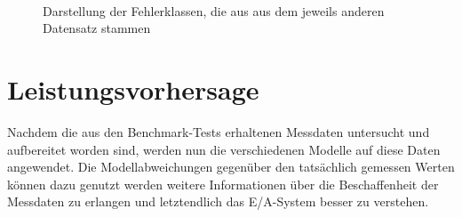 \documentclass[
	12pt,
	a4paper,
	BCOR10mm,
	DIV14,
	listof=totoc,
	bibliography=totoc,
	headsepline
]{scrreprt}
\begin{document}
\begin{figure}
	\centering
	\hfill
	\\
	\hfill
	\caption{Darstellung der Fehlerklassen, die aus aus dem jeweils anderen Datensatz stammen}
	\label{fig:error_classes_switched}
\end{figure} 
\clearpage

\section{Leistungsvorhersage}
\label{eval:leistungsvorhersage}
Nachdem die aus den Benchmark-Tests erhaltenen Messdaten untersucht und aufbereitet worden sind, werden nun die verschiedenen Modelle auf diese Daten angewendet.
Die Modellabweichungen gegenüber den tatsächlich gemessen Werten können dazu genutzt werden weitere Informationen über die Beschaffenheit der Messdaten zu erlangen und letztendlich das E/A-System besser zu verstehen.\medskip
\end{document}
